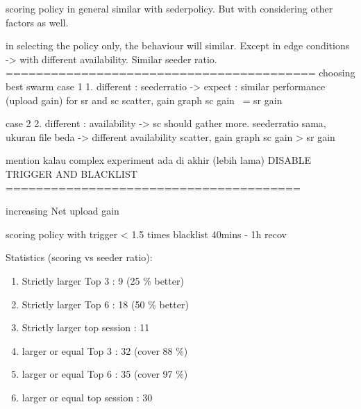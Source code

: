 
scoring policy in general similar with sederpolicy. But with considering other factors as well.

in selecting the policy only, the behaviour will similar. Except in edge conditions -> with different availability. Similar seeder ratio.
=========================================
choosing best swarm
case 1
1. different : seederratio -> expect : similar performance (upload gain) for sr and sc
scatter, gain graph
sc gain ~= sr gain

case 2
2. different : availability -> sc should gather more. seederratio sama, ukuran file beda -> different availability
scatter, gain graph
sc gain > sr gain

mention kalau complex experiment ada di akhir (lebih lama)
DISABLE TRIGGER AND BLACKLIST
=======================================

increasing Net upload gain

scoring policy
with trigger < 1.5 times
blacklist 40mins - 1h recov


Statistics (scoring vs seeder ratio): 
\begin{enumerate}
	\item Strictly larger Top 3  : 9 (25 \% better)
	\item Strictly larger Top 6  : 18 (50 \% better)
	\item Strictly larger top session  : 11
	\item larger or equal Top 3  : 32 (cover 88 \%)
	\item larger or equal Top 6  : 35 (cover 97 \%)
	\item larger or equal top session  : 30
\end{enumerate}

